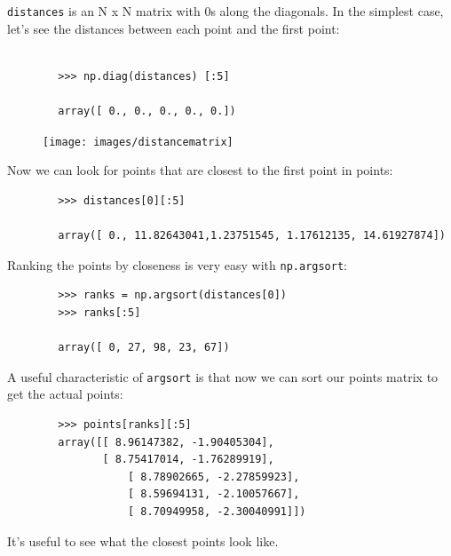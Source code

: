 \documentclass[SKL-MASTER.tex]{subfiles}
\begin{document}
	\noindent \texttt{distances} is an N x N matrix with 0s along the diagonals. In the simplest case, let's see the
	distances between each point and the first point:
	
	\begin{framed}
		\begin{verbatim}
		
		>>> np.diag(distances) [:5]
		
		array([ 0., 0., 0., 0., 0.])
		\end{verbatim}
	\end{framed}
	\begin{figure}[h!]
\centering
\texttt{[image: images/distancematrix]}
\end{figure}

	Now we can look for points that are closest to the first point in points:
	{\large
	\begin{framed}
		\begin{verbatim}
		>>> distances[0][:5]
		
		array([ 0., 11.82643041,1.23751545, 1.17612135, 14.61927874])
		\end{verbatim}
	\end{framed}
}
	Ranking the points by closeness is very easy with \texttt{np.argsort}:
	\begin{framed}
		\begin{verbatim}
		>>> ranks = np.argsort(distances[0])
		>>> ranks[:5]
		
		array([ 0, 27, 98, 23, 67])
		\end{verbatim}
	\end{framed}
	A useful characteristic of \texttt{argsort} is that now we can sort our points matrix to get the
	actual points:
	\begin{framed}
		\begin{verbatim}
		>>> points[ranks][:5]
	    array([[ 8.96147382, -1.90405304],
	           [ 8.75417014, -1.76289919],
		           [ 8.78902665, -2.27859923],
		           [ 8.59694131, -2.10057667],
		           [ 8.70949958, -2.30040991]])
		\end{verbatim}
	\end{framed}
	It's useful to see what the closest points look like. 
	
\end{document}
